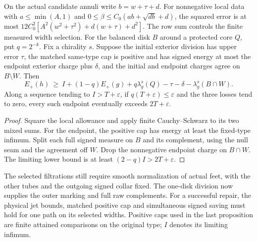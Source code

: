 \begin{proposition}
\label{prop:ed03-measured-endpoint-wall}
\leanok
On the actual candidate annuli write $b=w+\tau+d$.
For nonnegative local data with $a\le\min(A,1)$ and
$0\le\beta\le C_0(ab+\sqrt{db}+d)$, the squared error is at most
$12 C_0^2[A^2(w^2+\tau^2)+d(w+\tau)+d^2]$.
The row sum controls the finite measured width selection. For the
balanced disk $B$ around a protected core $Q$, put $q=2^{-k}$.
Fix a chirality $s$. Suppose the initial exterior division has upper
error $\tau$, the matched same-type cap is positive and has signed
energy at most the endpoint exterior charge plus $\delta$, and the
initial and endpoint charges agree on $B\setminus W$. Then
\[
 E_+(h)\ \ge\ I+(1-q)E_+(g)+q\lambda_g^s(Q)
          -\tau-\delta-\lambda_g^s(B\cap W).
\]
Along a sequence tending to $I>T+\varepsilon$, if
$q(T+\varepsilon)\le\varepsilon$ and the three losses tend to zero,
every such endpoint eventually exceeds $2T+\varepsilon$.
\end{proposition}
\begin{proof}
\leanok
Square the local allowance and apply finite Cauchy--Schwarz to its two
mixed sums. For the endpoint, the positive cap has energy at least the
fixed-type infimum. Split each full signed measure on $B$ and its
complement, using the null seam and the agreement off $W$. Drop the
nonnegative endpoint charge on $B\cap W$. The limiting lower bound
is at least $(2-q)I>2T+\varepsilon$.
\end{proof}

The selected filtrations still require smooth normalization of actual feet,
with the other tubes and the outgoing signed collar fixed. The one-disk
division now supplies the outer marking and full raw complements. For a successful
repair, the physical jet bounds, matched positive cap and simultaneous signed
saving must hold for one path on its selected widths. Positive caps used in
the last proposition are finite attained comparisons on the original type;
$I$ denotes its limiting infimum.
